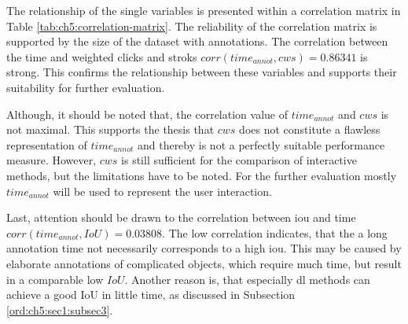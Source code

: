 The relationship of the single variables is presented within a correlation matrix in Table \ref{tab:ch5:correlation-matrix}.
The reliability of the correlation matrix is supported by the size of the dataset with \getNumberBenchmarkAnnotations \space annotations.
The correlation between the time and weighted clicks and stroks $ corr \left(time_{annot}, cws \right) = 0.86341 $ is strong.
This confirms the relationship between these variables and supports their suitability for further evaluation.

Although, it should be noted that, the correlation value of $time_{annot}$ and $cws$ is not maximal.
This supports the thesis that $cws$ does not constitute a flawless representation of $time_{annot}$ and thereby is not a perfectly suitable performance measure.
However, $cws$ is still sufficient for the comparison of interactive methods, but the limitations have to be noted.
For the further evaluation mostly $time_{annot}$ will be used to represent the user interaction.

Last, attention should be drawn to the correlation between \gls{iou} and time \linebreak $ corr \left(time_{annot}, IoU \right) = 0.03808 $.
The low correlation indicates, that the a long annotation time not necessarily corresponds to a high \gls{iou}.
This may be caused by elaborate annotations of complicated objects, which require much time, but result in a comparable low $ IoU $.
Another reason is, that especially \gls{dl} methods can achieve a good IoU in little time, as discussed in Subsection \ref{ord:ch5:sec1:subsec3}.


